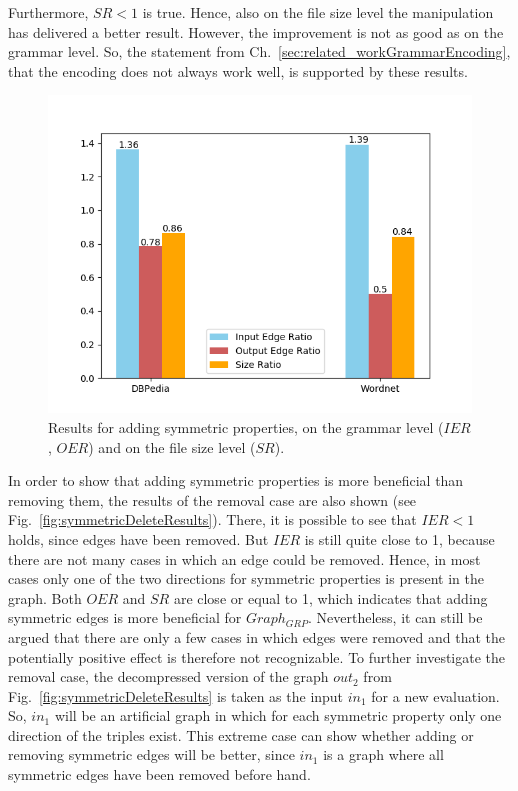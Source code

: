 Furthermore, $SR<1$ is true. Hence, also on the file size level the manipulation has delivered a better result. However, the improvement is not as good as on the grammar level. So, the statement from Ch.~\ref{sec:related_workGrammarEncoding}, that the encoding does not always work well, is supported by these results. 



\begin{figure}
	\centering
	\includegraphics[width=0.8\linewidth]{figures/4_evaluation/ontology/ratiosSymmetricsAdd}
	\caption{Results for adding symmetric properties, on the grammar level ($IER$, $OER$) and on the file size level ($SR$).}
	\label{fig:symmetricAddResults}
\end{figure}


In order to show that adding symmetric properties is more beneficial than removing them, the results of the removal case are also shown (see Fig.~\ref{fig:symmetricDeleteResults}). There, it is possible to see that $IER<1$ holds, since edges have been removed. But $IER$ is still quite close to 1, because there are not many cases in which an edge could be removed. Hence, in most cases only one of the two directions for symmetric properties is present in the graph. Both $OER$ and $SR$ are close or equal to 1, which indicates that adding symmetric edges is more beneficial for $Graph_{GRP}$. Nevertheless, it can still be argued that there are only a few cases in which edges were removed and that the potentially positive effect is therefore not recognizable. To further investigate the removal case, the decompressed version of the graph $out_2$ from Fig.~\ref{fig:symmetricDeleteResults} is taken as the input $in_1$ for a new evaluation. So, $in_1$ will be an artificial graph in which for each symmetric property only one direction of the triples exist. This extreme case can show whether adding or removing symmetric edges will be better, since $in_1$ is a graph where all symmetric edges have been removed before hand.

